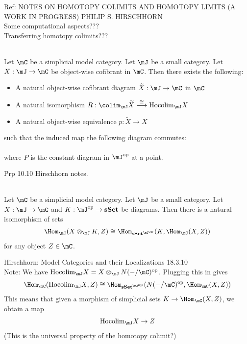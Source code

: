 \documentclass[a4paper]{article}
\begin{document}
Ref: NOTES ON HOMOTOPY COLIMITS AND HOMOTOPY LIMITS (A WORK IN PROGRESS) PHILIP S. HIRSCHHORN\\

Some computational aspects???\\

Transferring homotopy colimits???

\begin{prp}{}{}\\ Let $\mC$ be a simplicial model category. Let $\mJ$ be a small category. Let $X:\mJ\to\mC$ be object-wise cofibrant in $\mC$. Then there exists the following: 
\begin{itemize}
\item A natural object-wise cofibrant diagram $\widetilde{X}:\mJ\to\mC$ in $\mC$
\item A natural isomorphism $R:\colim_\mJ\widetilde{X}\overset{\cong}{\longrightarrow}\text{Hocolim}_\mJ X$
\item A natural object-wise equivalence $p:\widetilde{X}\to X$
\end{itemize}
such that the induced map the following diagram commutes: \\
\\
where $P$ is the constant diagram in $\mJ^\text{op}$ at a point. 
\end{prp}

Prp 10.10 Hirschhorn notes. 

\begin{prp}{}{}\\ Let $\mC$ be a simplicial model category. Let $\mJ$ be a small category. Let $X:\mJ\to\mC$ and $K:\mJ^\text{op}\to\bold{sSet}$ be diagrams. Then there is a natural isomorphism of sets $$\Hom_\mC(X\otimes_\mJ K,Z)\cong\Hom_{\bold{sSet}^{\mJ^\text{op}}}(K,\Hom_\mC(X,Z))$$ for any object $Z\in\mC$. 
\end{prp}

Hirschhorn: Model Categories and their Localizations 18.3.10\\

Note: We have $\text{Hocolim}_\mJ X=X\otimes_\mJ N(-/\mC)^\text{op}$. Plugging this in gives $$\Hom_\mC(\text{Hocolim}_\mJ X,Z)\cong\Hom_{\bold{sSet}^{\mJ^\text{op}}}(N(-/\mC)^\text{op},\Hom_\mC(X,Z))$$ This means that given a morphism of simplicial sets $K\to\Hom_\mC(X,Z)$, we obtain a map $$\text{Hocolim}_\mJ X\to Z$$ (This is the universal property of the homotopy colimit?)
\end{document}
